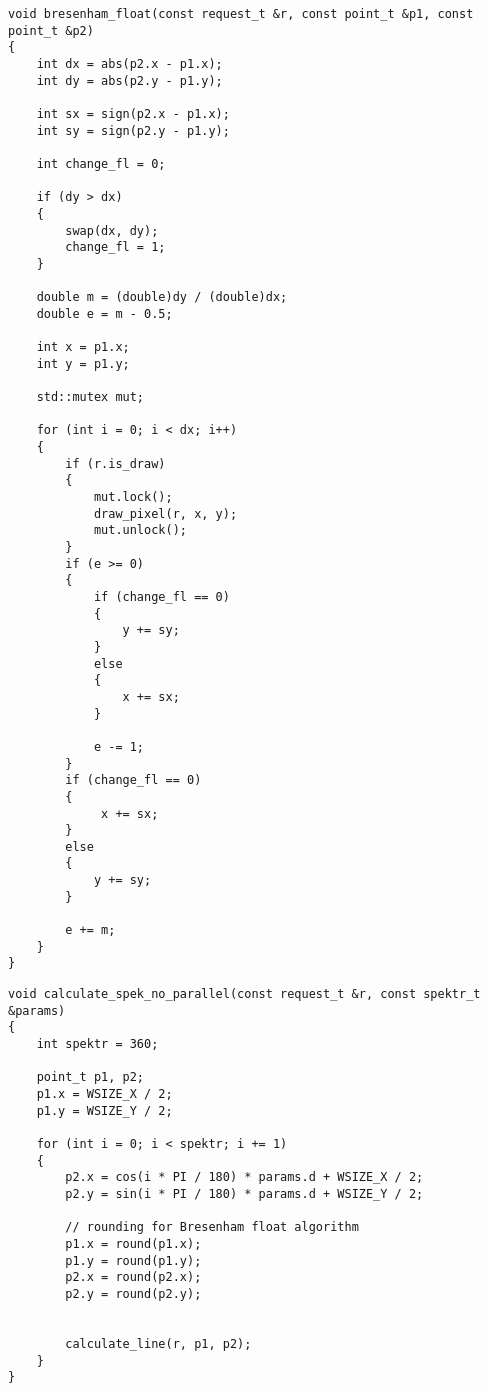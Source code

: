 \begin{lstlisting}[caption=Функция алгоритма Брезенехема для построения отрезка, 
    label={bres_alg}]
void bresenham_float(const request_t &r, const point_t &p1, const point_t &p2)
{
    int dx = abs(p2.x - p1.x);
    int dy = abs(p2.y - p1.y);

    int sx = sign(p2.x - p1.x);
    int sy = sign(p2.y - p1.y);

    int change_fl = 0;

    if (dy > dx)
    {
        swap(dx, dy);
        change_fl = 1;
    }

    double m = (double)dy / (double)dx;
    double e = m - 0.5;

    int x = p1.x;
    int y = p1.y;

    std::mutex mut;

    for (int i = 0; i < dx; i++)
    {
        if (r.is_draw)
        {
            mut.lock();
            draw_pixel(r, x, y);
            mut.unlock();
        }
        if (e >= 0)
        {
            if (change_fl == 0)
            {
                y += sy;
            }
            else
            {
                x += sx;
            }

            e -= 1;
        }
        if (change_fl == 0)
        {
             x += sx;
        }
        else
        {
            y += sy;
        }

        e += m;
    }
}
\end{lstlisting}


\begin{lstlisting}[caption=Функция алгоритма построения спектра отрезков по Брезенехему (без многопоточности),
    label={no_par}]
void calculate_spek_no_parallel(const request_t &r, const spektr_t &params)
{
    int spektr = 360;

    point_t p1, p2;
    p1.x = WSIZE_X / 2;
    p1.y = WSIZE_Y / 2;

    for (int i = 0; i < spektr; i += 1)
    {
        p2.x = cos(i * PI / 180) * params.d + WSIZE_X / 2;
        p2.y = sin(i * PI / 180) * params.d + WSIZE_Y / 2;

        // rounding for Bresenham float algorithm
        p1.x = round(p1.x);
        p1.y = round(p1.y);
        p2.x = round(p2.x);
        p2.y = round(p2.y);


        calculate_line(r, p1, p2);
    }
}
\end{lstlisting}

